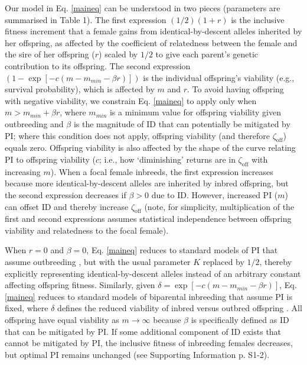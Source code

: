 \documentclass[12pt]{article}
\begin{document}
Our model in Eq. \ref{maineq} can be understood in two pieces (parameters are summarised in Table 1). The first expression $\left(1/2\right) \left(1 + r\right)$ is the inclusive fitness increment that a female gains from identical-by-descent alleles inherited by her offspring, as affected by the coefficient of relatedness between the female and the sire of her offspring ($r$) scaled by $1/2$ to give each parent's genetic contribution to its offspring. The second expression $\left(1 - \exp\left[-c\left(m-m_{min}-\beta r\right)\right]\right)$ is the individual offspring's viability (e.g., survival probability), which is affected by $m$ and $r$. To avoid having offspring with negative viability, we constrain Eq. \ref{maineq} to apply only when $m > m_{min} + \beta r$, where $m_{min}$ is a minimum value for offspring viability given outbreeding and $\beta$ is the magnitude of ID that can potentially be mitigated by PI; where this condition does not apply, offspring viability (and therefore $\zeta_{\textrm{off}}$) equals zero. Offspring viability is also affected by the shape of the curve relating PI to offspring viability ($c$; i.e., how `diminishing' returns are in $\zeta_{\textrm{off}}$ with increasing $m$). When a focal female inbreeds, the first expression increases because more identical-by-descent alleles are inherited by inbred offspring, but the second expression decreases if $\beta>0$ due to ID. However, increased PI ($m$) can offset ID and thereby increase $\zeta_{\textrm{off}}$ (note, for simplicity, multiplication of the first and second expressions assumes statistical independence between offspring viability and relatedness to the focal female).

When $r=0$ and $\beta=0$, Eq. \ref{maineq} reduces to standard models of PI that assume outbreeding \cite[e.g.,][]{Macnair1978, Parker1978}, but with the usual parameter $K$ replaced by $1/2$, thereby explicitly representing identical-by-descent alleles instead of an arbitrary constant affecting offspring fitness. Similarly, given $\delta = \exp\left[-c\left(m-m_{min}-\beta r\right)\right]$, Eq. \ref{maineq} reduces to standard models of biparental inbreeding that assume PI is fixed, where $\delta$ defines the reduced viability of inbred versus outbred offspring \cite[see][]{Kokko2006, Parker2006, Duthie2015a}.  All offspring have equal viability as $m \to \infty$ because $\beta$ is specifically defined as ID that can be mitigated by PI. If some additional component of ID exists that cannot be mitigated by PI, the inclusive fitness of inbreeding females decreases, but optimal PI remains unchanged (see Supporting Information p. S1-2).
\end{document}
